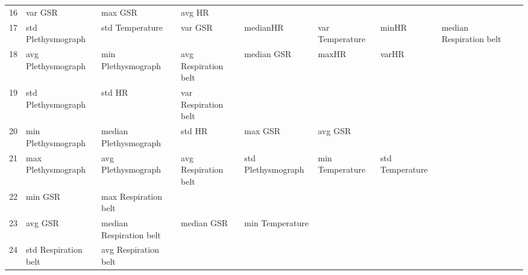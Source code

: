 \begin{landscape}
\begin{table}[]
\begin{tabular}{l|llllllll}
16       & var GSR                 & max GSR                 & avg HR                  &                         &                         &                       &                         &                         &                         &         \\
17       & std Plethysmograph      & std Temperature         & var GSR                 & medianHR                & var Temperature         & minHR                 & median Respiration belt &                         &                         &         \\
18       & avg Plethysmograph      & min Plethysmograph      & avg Respiration belt    & median GSR              & maxHR                   & varHR                 &                         &                         &                         &         \\
19       & std Plethysmograph      & std HR                  & var Respiration belt    &                         &                         &                       &                         &                         &                         &         \\
20       & min Plethysmograph      & median Plethysmograph   & std HR                  & max GSR                 & avg GSR                 &                       &                         &                         &                         &         \\
21       & max Plethysmograph      & avg Plethysmograph      & avg Respiration belt    & std Plethysmograph      & min Temperature         & std Temperature       &                         &                         &                         &         \\
22       & min GSR                 & max Respiration belt    &                         &                         &                         &                       &                         &                         &                         &         \\
23       & avg GSR                 & median Respiration belt & median GSR              & min Temperature         &                         &                       &                         &                         &                         &         \\
24       & std Respiration belt    & avg Respiration belt    &                         &                         &                         &                       &                         &                         &                         &         \\

\end{tabular}
\end{table}
\end{landscape}
